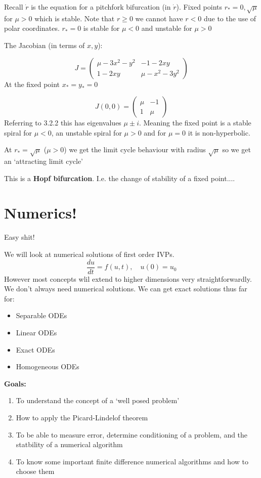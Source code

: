 \documentclass{/home/janmebows/Documents/LatexTemplates/myassignment}
\begin{document}
Recall $\dot r$ is the equation for a pitchfork bifurcation (in $\dot r$).
Fixed points $r_*=0,\sqrt{\mu}$ for $\mu > 0$ which is stable. Note that $r \geq0$ we cannot have $r<0$ due to the use of polar coordinates. 
$r_*=0$ is stable for $\mu <0$ and unstable for $\mu >0$


The Jacobian (in terms of $x,y$):

    
\[J = \begin{pmatrix}
    \mu -3x^2 - y^2 &-1 -2xy\\
    1-2xy & \mu - x^2 - 3y^2
\end{pmatrix}\]
At the fixed point $x_*=y_*=0$ 

\[J(0,0) = \begin{pmatrix}
    \mu&-1\\1&\mu
\end{pmatrix}\]
Referring to 3.2.2 this has eigenvalues $\mu\pm i$. Meaning the fixed point is a stable spiral for $\mu <0$, an unstable spiral for $\mu > 0$ and for $\mu =0$ it is non-hyperbolic.

At $r_* = \sqrt{\mu}$ ($\mu > 0$) we get the limit cycle behaviour with radius $\sqrt{\mu}$ so we get an `attracting limit cycle'

This is a \textbf{Hopf bifurcation}. I.e. the change of stability of a fixed point....







\section{Numerics!}
Easy shit!

We will look at numerical solutions of first order IVPs.
\[\frac{du}{dt} = f(u,t), \quad u(0) = u_0\]
However most concepts wlil extend to higher dimensions very straightforwardly.
We don't always need numerical solutions. We can get exact solutions thus far for:
\begin{itemize}
    \item Separable ODEs
    \item Linear ODEs
    \item Exact ODEs
    \item Homogeneous ODEs 
\end{itemize}

\textbf{Goals:}
\begin{enumerate}
    \item To understand the concept of a `well posed problem'
    \item How to apply the Picard-Lindelof theorem
    \item To be able to measure error, determine conditioning of a problem, and the statbility of a numerical algorithm
    \item To know some important finite difference numerical algorithms and how to choose them 
\end{enumerate}
\end{document}
